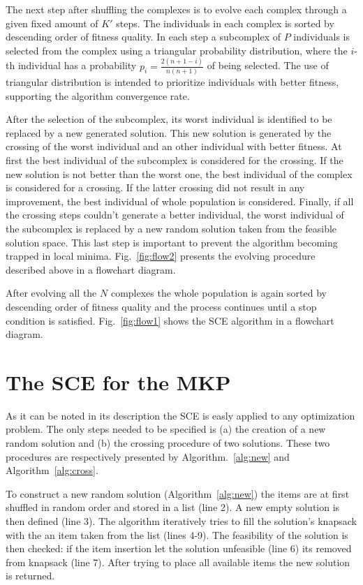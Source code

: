 \documentclass[a0,portrait]{a0poster}
\begin{document}
\begin{multicols}{2}
The next step after shuffling the complexes is to evolve each complex through
a given fixed amount of $K'$ steps.
The individuals in each complex is sorted by descending order of fitness quality.
In each step a subcomplex of $P$ individuals is selected from the
complex using a triangular probability distribution, where the $i$-th individual
has a probability $p_i = \frac{2(n+1-i)}{n(n+1)}$ of being selected.
The use of triangular distribution is intended to prioritize individuals with
better fitness, supporting the algorithm convergence rate.

After the selection of the subcomplex, its worst individual is identified to
be replaced by a new generated solution.
This new solution is generated by the crossing of the worst individual and an
other individual with better fitness.
At first the best individual of the subcomplex is considered for the crossing.
If the new solution is not better than the worst one, the best individual
of the complex is considered for a crossing.
If the latter crossing did not result in any improvement, the best individual
of whole population is considered.
Finally, if all the crossing steps couldn't generate a better individual,
the worst individual of the subcomplex is replaced by a new random solution taken
from the feasible solution space.
This last step is important to prevent the algorithm becoming trapped in local minima.
Fig.~\ref{fig:flow2} presents the evolving procedure described above in a flowchart diagram.

After evolving all the $N$ complexes the whole population is again
sorted by descending order of fitness quality and the process continues until
a stop condition is satisfied.
Fig.~\ref{fig:flow1} shows the SCE algorithm in a flowchart diagram.

\section*{The SCE for the MKP}

As it can be noted in its description the SCE is easly applied to any
optimization problem.
The only steps needed to be specified is (a) the creation of a new random
solution and (b) the crossing procedure of two solutions.
These two procedures are respectively presented by Algorithm.~\ref{alg:new} and
Algorithm~\ref{alg:cross}.

To construct a new random solution (Algorithm~\ref{alg:new}) the items are
at first shuffled in random order and stored in a list (line 2).
A new empty solution is then defined (line 3).
The algorithm iteratively tries to fill the solution's knapsack with 
the an item taken from the list (lines 4-9).
The feasibility of the solution is then checked: if the item insertion let
the solution unfeasible (line 6) its removed from knapsack (line 7).
After trying to place all available items the new solution is returned.


\end{multicols}
\end{document}
